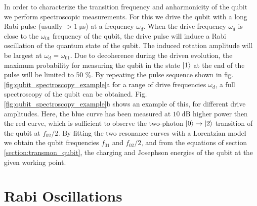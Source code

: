 In order to characterize the transition frequency and anharmonicity of the qubit we perform spectroscopic measurements. For this we drive the qubit with a long Rabi pulse (usually $> 1\;\mathrm{\mu}$s) at a frequency $\omega_d$. When the drive frequency $\omega_{d}$ is close to the $\omega_{01}$ frequency of the qubit, the drive pulse will induce a Rabi oscillation of the quantum state of the qubit. The induced rotation amplitude will be largest at $\omega_d=\omega_{01}$. Due to decoherence during the driven evolution, the maximum probability for measuring the qubit in the state $\left| 1 \right>$ at the end of the pulse will be limited to 50 \%. By repeating the pulse sequence shown in fig. \ref{fig:qubit_spectroscopy_example}a for a range of drive frequencies $\omega_d$, a full spectroscopy of the qubit can be obtained. Fig. \ref{fig:qubit_spectroscopy_example}b shows an example of this, for different drive amplitudes. Here, the blue curve has been measured at $10\;\mathrm{dB}$ higher power then the red curve, which is sufficient to observe the two-photon $\left| 0 \right>\to\left| 2 \right>$ transition of the qubit at $f_{02}/2$. By fitting the two resonance curves with a Lorentzian model we obtain the qubit frequencies $f_{01}$ and $f_{02}/2$, and from the equations of section \ref{section:transmon_qubit}, the charging and Josephson energies of the qubit at the given working point.

\section{Rabi Oscillations} \label{section:qubit_rabi}

